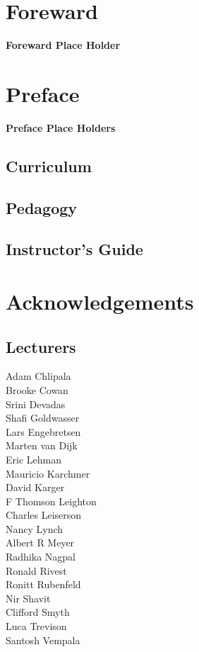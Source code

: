 \chapter*{Foreward}
\textbf{Foreward Place Holder}

\chapter*{Preface}

\textbf{Preface Place Holders}

\section*{Curriculum}

\section*{Pedagogy}

\section*{Instructor's Guide}

\chapter*{Acknowledgements}

\section*{Lecturers}

Adam Chlipala\\
Brooke Cowan\\
Srini Devadas\\
Shafi Goldwasser\\
Lars Engebretsen\\
Marten van Dijk\\
Eric Lehman\\
Mauricio Karchmer\\
David Karger\\
F Thomson Leighton\\
Charles Leiserson\\
Nancy Lynch\\
Albert R Meyer\\
Radhika Nagpal\\
Ronald Rivest\\
Ronitt Rubenfeld\\
Nir Shavit\\
Clifford Smyth\\
Luca Trevison\\
Santosh Vempala

